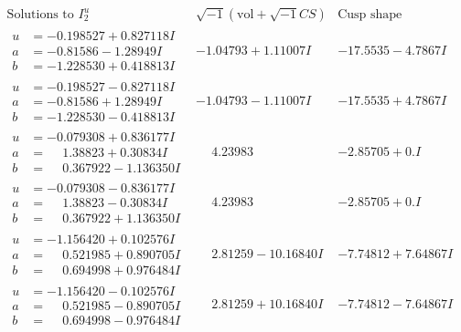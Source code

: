\documentclass[1p]{elsarticle_modified}
\theoremstyle{definition}
\newcommand{\I}{\sqrt{-1}}
\begin{document}
$$\begin{array}{c|c|c}  
\text{Solutions to }I^u_{2}& \I (\text{vol} + \sqrt{-1}CS) & \text{Cusp shape}\\
 \hline 
\begin{aligned}
u &= -0.198527 + 0.827118 I \\
a &= -0.81586 - 1.28949 I \\
b &= -1.228530 + 0.418813 I\end{aligned}
 & -1.04793 + 1.11007 I & -17.5535 - 4.7867 I \\ \hline\begin{aligned}
u &= -0.198527 - 0.827118 I \\
a &= -0.81586 + 1.28949 I \\
b &= -1.228530 - 0.418813 I\end{aligned}
 & -1.04793 - 1.11007 I & -17.5535 + 4.7867 I \\ \hline\begin{aligned}
u &= -0.079308 + 0.836177 I \\
a &= \phantom{-}1.38823 + 0.30834 I \\
b &= \phantom{-}0.367922 - 1.136350 I\end{aligned}
 & \phantom{-}4.23983\phantom{ +0.000000I} & -2.85705 + 0. I\phantom{ +0.000000I} \\ \hline\begin{aligned}
u &= -0.079308 - 0.836177 I \\
a &= \phantom{-}1.38823 - 0.30834 I \\
b &= \phantom{-}0.367922 + 1.136350 I\end{aligned}
 & \phantom{-}4.23983\phantom{ +0.000000I} & -2.85705 + 0. I\phantom{ +0.000000I} \\ \hline\begin{aligned}
u &= -1.156420 + 0.102576 I \\
a &= \phantom{-}0.521985 + 0.890705 I \\
b &= \phantom{-}0.694998 + 0.976484 I\end{aligned}
 & \phantom{-}2.81259 - 10.16840 I & -7.74812 + 7.64867 I \\ \hline\begin{aligned}
u &= -1.156420 - 0.102576 I \\
a &= \phantom{-}0.521985 - 0.890705 I \\
b &= \phantom{-}0.694998 - 0.976484 I\end{aligned}
 & \phantom{-}2.81259 + 10.16840 I & -7.74812 - 7.64867 I \\ \hline\begin{aligned}

\end{aligned}
\end{array}$$
\end{document}
